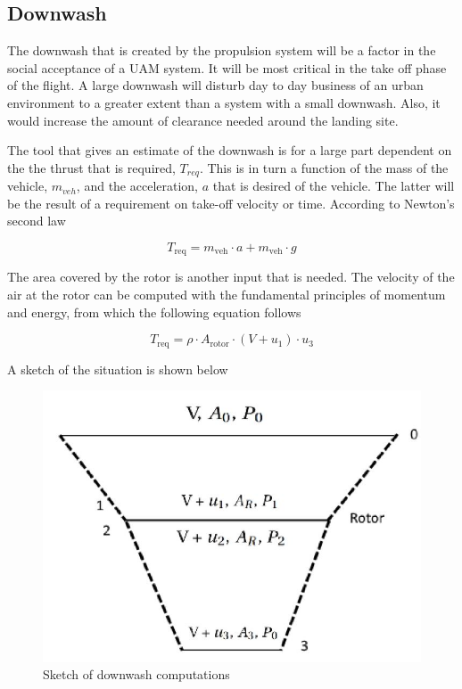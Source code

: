 \subsection{Downwash}
The downwash that is created by the propulsion system will be a factor in the social acceptance of a UAM system. It will be most critical in the take off phase of the flight. A large downwash will disturb day to day business of an urban environment to a greater extent than a system with a small downwash. Also, it would increase the amount of clearance needed around the landing site. 

The tool that gives an estimate of the downwash is for a large part dependent on the the thrust that is required, $T_{req}$. This is in turn a function of the mass of the vehicle, $m_{veh}$, and the acceleration, $a$ that is desired of the vehicle. The latter will be the result of a requirement on take-off velocity or time. According to Newton's second law 

\begin{equation}
\label{downwasheq}
    T_\text{req} = m_\text{veh} \cdot a + m_\text{veh} \cdot g 
\end{equation}

The area covered by the rotor is another input that is needed. The velocity of the air at the rotor can be computed with the fundamental principles of momentum and energy, from which the following equation follows 

\begin{equation}
\label{fancyconservationlaws}
    T_\text{req} = \rho\cdot A_\text{rotor}\cdot(V + u_1)\cdot u_3 
\end{equation}

A sketch of the situation is shown below

\begin{figure}[H]
    \centering
    \includegraphics[width=0.5\linewidth]{Figures/downwashsketch.JPG}
    \captionsetup{justification=centering}
    \caption{Sketch of downwash computations}
    \label{downwashsketch}
\end{figure}

